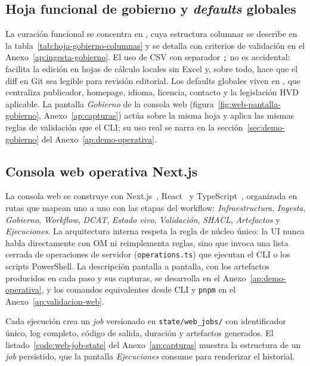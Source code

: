 \subsection{Hoja funcional de gobierno y \emph{defaults} globales}\label{sec:implementacion-hoja}

La curación funcional se concentra en , cuya estructura columnar se describe en la tabla~\ref{tab:hoja-gobierno-columnas} y se detalla con criterios de validación en el Anexo~\ref{ap:ingesta-gobierno}. El uso de \ac{CSV} con separador \texttt{;} no es accidental: facilita la edición en hojas de cálculo locales sin Excel y, sobre todo, hace que el diff en Git sea legible para revisión editorial. Los defaults globales viven en , que centraliza publicador, homepage, idioma, licencia, contacto y la legislación \ac{HVD} aplicable. La pantalla \emph{Gobierno} de la consola web (figura~\ref{fig:web-pantalla-gobierno}, Anexo~\ref{ap:capturas}) actúa sobre la misma hoja y aplica las mismas reglas de validación que el \ac{CLI}; su uso real se narra en la sección~\ref{sec:demo-gobierno} del Anexo~\ref{ap:demo-operativa}.

\subsection{Consola web operativa Next.js}\label{sec:implementacion-web}

La consola web se construye con Next.js~\cite{nextjsDocs}, React~\cite{reactDocs} y TypeScript~\cite{typescriptHandbook}, organizada en rutas que mapean uno a uno con las etapas del workflow: \emph{Infraestructura}, \emph{Ingesta}, \emph{Gobierno}, \emph{Workflow}, \emph{DCAT}, \emph{Estado vivo}, \emph{Validación}, \emph{SHACL}, \emph{Artefactos} y \emph{Ejecuciones}. La arquitectura interna respeta la regla de núcleo único: la \ac{UI} nunca habla directamente con \ac{OM} ni reimplementa reglas, sino que invoca una lista cerrada de operaciones de servidor (\texttt{operations.ts}) que ejecutan el \ac{CLI} o los scripts PowerShell. La descripción pantalla a pantalla, con los artefactos producidos en cada paso y sus capturas, se desarrolla en el Anexo~\ref{ap:demo-operativa}, y los comandos equivalentes desde \ac{CLI} y \texttt{pnpm} en el Anexo~\ref{ap:validacion-web}.

Cada ejecución crea un \emph{job} versionado en \texttt{state/web\_jobs/} con identificador único, log completo, código de salida, duración y artefactos generados. El listado~\ref{code:web-job-state} del Anexo~\ref{ap:capturas} muestra la estructura de un \emph{job} persistido, que la pantalla \emph{Ejecuciones} consume para renderizar el historial.

